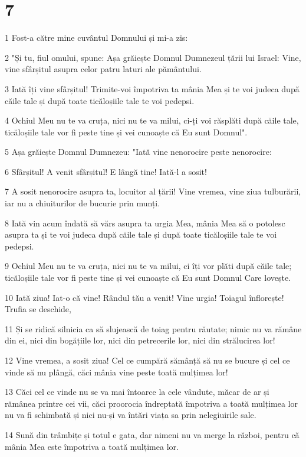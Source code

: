 \chapter{7}

\par 1 Fost-a către mine cuvântul Domnului și mi-a zis:
\par 2 "Și tu, fiul omului, spune: Așa grăiește Domnul Dumnezeul țării lui Israel: Vine, vine sfârșitul asupra celor patru laturi ale pământului.
\par 3 Iată îți vine sfârșitul! Trimite-voi împotriva ta mânia Mea și te voi judeca după căile tale și după toate ticăloșiile tale te voi pedepsi.
\par 4 Ochiul Meu nu te va cruța, nici nu te va milui, ci-ți voi răsplăti după căile tale, ticăloșiile tale vor fi peste tine și vei cunoaște că Eu sunt Domnul".
\par 5 Așa grăiește Domnul Dumnezeu: "Iată vine nenorocire peste nenorocire:
\par 6 Sfârșitul! A venit sfârșitul! E lângă tine! Iată-l a sosit!
\par 7 A sosit nenorocire asupra ta, locuitor al țării! Vine vremea, vine ziua tulburării, iar nu a chiuiturilor de bucurie prin munți.
\par 8 Iată vin acum îndată să vărs asupra ta urgia Mea, mânia Mea să o potolesc asupra ta și te voi judeca după căile tale și după toate ticăloșiile tale te voi pedepsi.
\par 9 Ochiul Meu nu te va cruța, nici nu te va milui, ci îți vor plăti după căile tale; ticăloșiile tale vor fi peste tine și vei cunoaște că Eu sunt Domnul Care lovește.
\par 10 Iată ziua! Iat-o că vine! Rândul tău a venit! Vine urgia! Toiagul înflorește! Trufia se deschide,
\par 11 Și se ridică silnicia ca să slujească de toiag pentru răutate; nimic nu va rămâne din ei, nici din bogățiile lor, nici din petrecerile lor, nici din strălucirea lor!
\par 12 Vine vremea, a sosit ziua! Cel ce cumpără sămânță să nu se bucure și cel ce vinde să nu plângă, căci mânia vine peste toată mulțimea lor!
\par 13 Căci cel ce vinde nu se va mai întoarce la cele vândute, măcar de ar și rămânea printre cei vii, căci proorocia îndreptată împotriva a toată mulțimea lor nu va fi schimbată și nici nu-și va întări viața sa prin nelegiuirile sale.
\par 14 Sună din trâmbițe și totul e gata, dar nimeni nu va merge la război, pentru că mânia Mea este împotriva a toată mulțimea lor.
